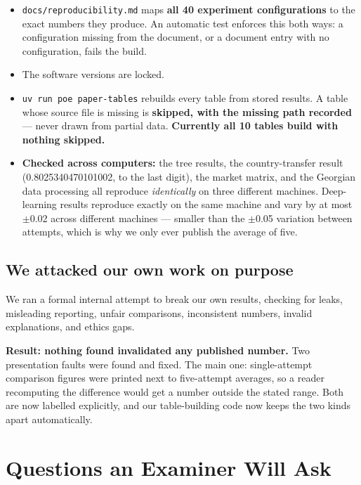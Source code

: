 \documentclass[11pt,a4paper]{article}
\newcommand{\code}[1]{\texttt{\small #1}}
\begin{document}
\begin{itemize}
  \item \code{docs/reproducibility.md} maps \textbf{all 40 experiment
        configurations} to the exact numbers they produce. An automatic test
        enforces this both ways: a configuration missing from the document, or a
        document entry with no configuration, fails the build.
  \item The software versions are locked.
  \item \code{uv run poe paper-tables} rebuilds every table from stored results. A
        table whose source file is missing is \textbf{skipped, with the missing
        path recorded} --- never drawn from partial data. \textbf{Currently all 10
        tables build with nothing skipped.}
  \item \textbf{Checked across computers:} the tree results, the country-transfer
        result (0.8025340470101002, to the last digit), the market matrix, and the
        Georgian data processing all reproduce \emph{identically} on three
        different machines. Deep-learning results reproduce exactly on the same
        machine and vary by at most $\pm$0.02 across different machines --- smaller
        than the $\pm$0.05 variation between attempts, which is why we only ever
        publish the average of five.
\end{itemize}

\subsection{We attacked our own work on purpose}

We ran a formal internal attempt to break our own results, checking for leaks,
misleading reporting, unfair comparisons, inconsistent numbers, invalid
explanations, and ethics gaps.

\textbf{Result: nothing found invalidated any published number.} Two presentation
faults were found and fixed. The main one: single-attempt comparison figures were
printed next to five-attempt averages, so a reader recomputing the difference
would get a number outside the stated range. Both are now labelled explicitly,
and our table-building code now keeps the two kinds apart automatically.

\section{Questions an Examiner Will Ask}
\end{document}

